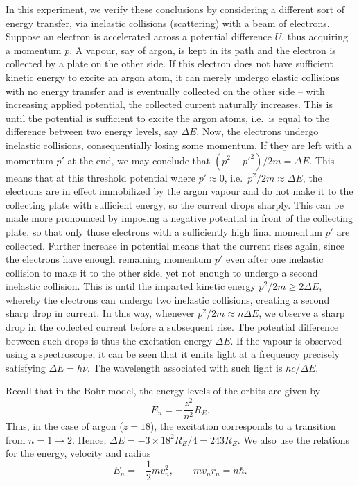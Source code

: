 \documentclass[11pt]{article}
\begin{document}
        In this experiment, we verify these conclusions by considering a different sort of energy transfer, via inelastic collisions (scattering)
        with a beam of electrons. Suppose an electron is accelerated across a potential difference $U$, thus acquiring a momentum $p$.
        A vapour, say of argon, is kept in its path and the electron is collected by a plate on the other side.
        If this electron does not have sufficient kinetic energy to excite an argon atom, it can merely undergo elastic collisions with no energy transfer
        and is eventually collected on the other side -- with increasing applied potential, the collected current naturally increases.
        This is until the potential is sufficient to excite the argon atoms, i.e.\ is equal to the difference between two energy levels,
        say $\Delta E$. Now, the electrons undergo inelastic collisions, consequentially losing some momentum. If they are left with a
        momentum $p'$ at the end, we may conclude that $(p^2 - p'^2)/2m = \Delta E$.
        This means that at this threshold potential where $p' \approx 0$, i.e.\ $p^2 /2m\approx \Delta E$, the electrons are in effect immobilized
        by the argon vapour and do not make it to the collecting plate with sufficient energy, so the current drops sharply.
        This can be made more pronounced by imposing a negative potential in front of the collecting plate, so that only those electrons
        with a sufficiently high final momentum $p'$ are collected.
        Further increase in potential means that the current rises again, since the electrons have enough remaining momentum $p'$ even after one
        inelastic collision to make it to the other side, yet not enough to undergo a second inelastic collision.
        This is until the imparted kinetic energy $p^2 /2m \geq 2\Delta E$, whereby the electrons can undergo two inelastic collisions, 
        creating a second sharp drop in current. In this way, whenever $p^2 /2m \approx n\Delta E$, we observe a sharp drop in the collected 
        current before a subsequent rise.
        The potential difference between such drops is thus the excitation energy $\Delta E$. If the vapour is observed using a spectroscope,
        it can be seen that it emits light at a frequency precisely satisfying  $\Delta E = h\nu$. The wavelength associated with such light
        is $hc /\Delta E$.

        Recall that in the Bohr model, the energy levels of the orbits are given by
        \[
                E_n = -\frac{z^2}{n^2}R_E.
        \]
        Thus, in the case of argon ($z = 18$), the excitation corresponds to a transition from $n = 1 \to 2$. Hence, $\Delta E = -3 \times 18^2 R_E/4
        = 243 R_E$.
        We also use the relations for the energy, velocity and radius
        \[
                E_n = -\frac{1}{2}m v_n^2, \qquad mv_nr_n = n\hbar.
        \]
\end{document}
